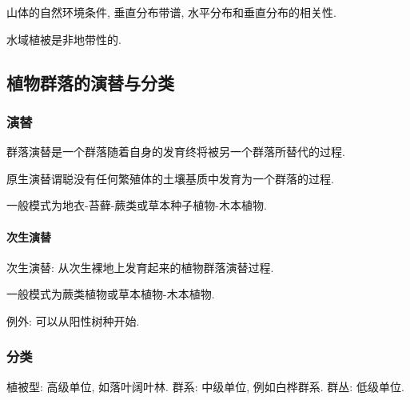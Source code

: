 \documentclass{ctexart}
\begin{document}
山体的自然环境条件, 垂直分布带谱, 水平分布和垂直分布的相关性.
\par
水域植被是非地带性的.



\subsection{植物群落的演替与分类} %
\label{sub:植物群落的演替与分类}

\subsubsection{演替} %
\label{ssub:演替}

群落演替是一个群落随着自身的发育终将被另一个群落所替代的过程.
\par
原生演替谓聪没有任何繁殖体的土壤基质中发育为一个群落的过程.
\par
一般模式为地衣-苔藓-蕨类或草本种子植物-木本植物.

\paragraph{次生演替} %
\label{par:次生演替}

次生演替: 从次生裸地上发育起来的植物群落演替过程.
\par
一般模式为蕨类植物或草本植物-木本植物.
\par
例外: 可以从阳性树种开始.



\subsubsection{分类} %
\label{ssub:分类}

植被型: 高级单位, 如落叶阔叶林. 群系: 中级单位, 例如白桦群系. 群丛: 低级单位.



\end{document}

